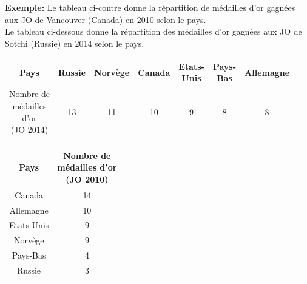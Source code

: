\documentclass[12pt,a4paper]{article}
\begin{document}
\begin{minipage}{0.71\textwidth}
\textbf{Exemple:}
Le tableau ci-contre donne la répartition de médailles d’or gagnées aux JO de Vancouver (Canada) en 2010 selon le pays.\\
Le tableau ci-dessous donne la répartition des médailles d’or gagnées aux JO de Sotchi (Russie) en 2014 selon le pays.\\
\begin{tabular}{|c|c|c|c|c|c|c|}
\hline
Pays       & Russie & Norvège & Canada & \thead{Etats-\\Unis} & \thead{Pays-\\Bas} & Allemagne
\\ \hline
\thead{Nombre de\\ médailles \\d’or\\ (JO 2014)}   & 13 & 11 & 10 & 9 & 8 & 8 \\ \hline
\end{tabular}

\end{minipage}
\begin{minipage}{0.3\textwidth}
\begin{tabular}{|c|c|}
\hline
Pays       & \thead{Nombre de\\ médailles d’or\\ (JO 2010)}\\ \hline
Canada     & 14                                                                                                  \\ \hline
Allemagne  & 10                                                                                                  \\ \hline
Etats-Unis & 9                                                                                                   \\ \hline
Norvège    & 9                                                                                                   \\ \hline
Pays-Bas   & 4                                                                                                   \\ \hline
Russie     & 3                                                                                                   \\ \hline
\end{tabular}
\end{minipage}\\
\end{document}
